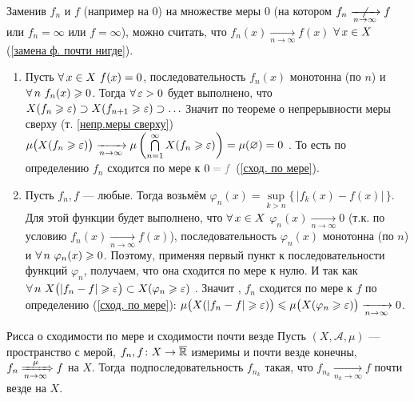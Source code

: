 \begin{prf}
	Заменив $f_n$ и $f$ (например на 0) на множестве меры 0 (на котором $f_n \notar{n \to \infty} f$ или $f_n = \infty$ или $f = \infty$), можно считать, что $f_n(x) \xrightarrow[n \to \infty]{} f(x)$ $\forall \, x \in X$ (\ref{замена ф. почти нигде}).
	\begin{enumerate}
		\item Пусть $\forall \, x \in X\ f(x) = 0$, последовательность $f_n(x)$ монотонна (по $n$) и $\forall \, n\ f_n(x) \geqslant 0$. Тогда  $\forall \, \varepsilon > 0$ будет выполнено, что $X(f_n \geqslant \varepsilon) \supset X(f_{n + 1} \geqslant \varepsilon) \supset \ldots$ Значит по теореме о непрерывности меры сверху (т. \ref{непр.меры сверху}) $\mu\bigl(X(f_n \geqslant \varepsilon)\bigr) \xrightarrow[n \to \infty]{}\mu\left(\bigcap\limits_{n = 1}^\infty X(f_n \geqslant \varepsilon)\right) = \mu(\varnothing)= 0$ . То есть по определению $f_n$ сходится по мере к $0 \uns{{}= f}$ (\ref{сход. по мере}).
		
		\item Пусть $f_n, f$ --- любые. Тогда возьмём $\varphi_n(x) = \sup\limits_{k > n}\{\,|f_k(x) - f(x)|\,\}$. Для этой функции будет выполнено, что $\forall \, x \in X$ $\varphi_n(x) \xrightarrow[n \to \infty]{} 0$ (т.к. по условию $f_n(x) \xrightarrow[n \to \infty]{} f(x)$), последовательность $\varphi_n(x)$ монотонна (по $n$)  и $\forall \, n\ \varphi_n(x) \geqslant 0$. Поэтому, применяя первый пункт к последовательности функций $\varphi_n$, получаем, что она сходится по мере к нулю. И так как $\forall \, n\ X\bigl(|f_n - f| \geqslant \varepsilon \bigr) \subset X(\varphi_n \geqslant \varepsilon)$ . Значит , $f_n$ сходится по мере к $f$ по определению (\ref{сход. по мере}): $\mu\bigl(X(|f_n - f|\geqslant \varepsilon )\bigr) \leqslant \mu\bigl(X(\varphi_n \geqslant \varepsilon)\bigr) \xrightarrow[n \to \infty]{} 0$.
	\end{enumerate}
\end{prf}

\begin{teor}[https://www.youtube.com/live/fVyBKDoy3EM?si=ihinyw9t2JTrKa9V&t=3118]{Рисса о сходимости по мере и сходимости почти везде}
	Пусть $(X, \mathcal A, \mu)$ --- пространство с мерой, $f_n, f \colon X \to \overline{\mathbb R}$ измеримы и почти везде конечны, $f_n \xRightarrow[n \to \infty]{\mu} f$ на $X$. Тогда\E\ подпоследовательность $f_{n_k}$ такая, что $f_{n_k} \xrightarrow[n_k \to \infty]{} f$ почти везде на $X$.
\end{teor}

